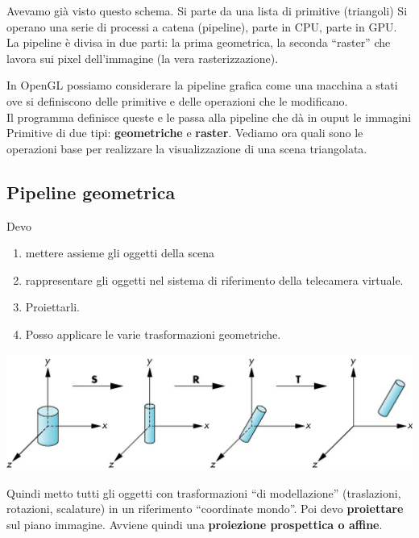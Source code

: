 \documentclass[a4paper, 10pt]{article}
\begin{document}
		Avevamo già visto questo schema. Si parte da una lista di primitive (triangoli)
		Si operano una serie di processi a catena (pipeline), parte in CPU, parte in GPU. La pipeline è divisa in due parti: la prima geometrica, la seconda “raster” che lavora sui pixel dell'immagine (la vera rasterizzazione).
		
		\bigskip
				
		In OpenGL possiamo considerare la pipeline grafica come una macchina a stati ove si definiscono delle primitive e delle operazioni che le modificano.\\
		Il programma definisce queste e le passa alla pipeline che dà in ouput le immagini
		Primitive di due tipi: \textbf{geometriche} e \textbf{raster}. Vediamo ora quali sono le operazioni base per realizzare la visualizzazione di una scena triangolata.
	
	
	\subsection{Pipeline geometrica}
		Devo 
		\begin{enumerate}
			\item mettere assieme gli oggetti della scena
			\item rappresentare gli oggetti nel sistema di riferimento della telecamera virtuale. \item Proiettarli. 
			\item Posso applicare le varie trasformazioni geometriche.
		\end{enumerate}
		
		\begin{center}
			\includegraphics[scale=0.3]{pipelineg}
		\end{center}

		Quindi metto tutti gli oggetti con trasformazioni “di modellazione” (traslazioni, rotazioni, scalature) in un riferimento “coordinate mondo”. Poi devo \textbf{proiettare} sul piano immagine. Avviene quindi una \textbf{proiezione prospettica o affine}.
		
\end{document}
